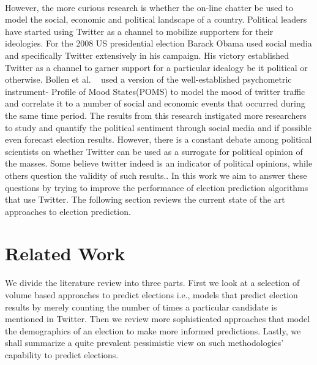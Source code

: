 \paragraph{}
However, the more curious research is whether the on-line chatter be used to model the social, economic and political landscape of a country.
Political leaders have started using Twitter as a channel to mobilize supporters for their ideologies.
For the 2008 US presidential election Barack Obama used social media and specifically Twitter extensively in his campaign. 
His victory established Twitter as a channel to garner support for a particular idealogy be it political or otherwise.
Bollen et al. ~\cite{bollen2011modeling} used a version of the well-established psychometric instrument- Profile of Mood States(POMS) to model the mood of twitter traffic and correlate it to a number of social and economic events that occurred during the same time period. 
The results from this research instigated more researchers to study and quantify the political sentiment through social media and if possible even forecast election results.
However, there is a constant debate among political scientists on whether Twitter can be used as a surrogate for political opinion of the masses.
Some believe twitter indeed is an indicator of political opinions, while others question the validity of such results.. 
In this work we aim to answer these questions by trying to improve the performance of election prediction algorithms that use Twitter.
The following section reviews the current state of the art approaches to election prediction. 

\section{Related Work}
We divide the literature review into three parts.
First we look at a selection of volume based approaches to predict elections i.e., models that predict election results by merely counting the number of times a particular candidate is mentioned in Twitter.
Then we review more sophisticated approaches that model the demographics of an election to make more informed predictions.
Lastly, we shall summarize a quite prevalent pessimistic view on such methodologies' capability to predict elections.
